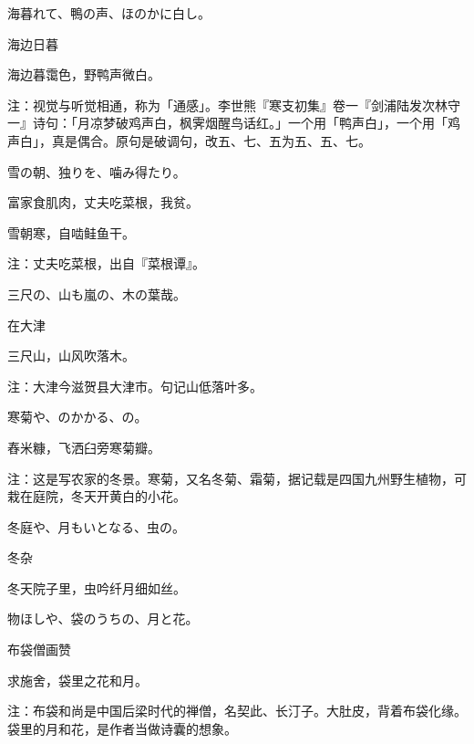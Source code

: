 \begin{haiku}
    {\FH 海暮れて、鴨の声、ほのかに白し。}

    {\FK 海边日暮}

    {\FK 海边暮霭色，野鸭声微白。}

    {\FT 注：视觉与听觉相通，称为「通感」。李世熊『寒支初集』卷一『剑浦陆发次林守一』诗句：「月凉梦破鸡声白，枫霁烟醒鸟话红。」一个用「鸭声白」，一个用「鸡声白」，真是偶合。原句是破调句，改五、七、五为五、五、七。}
\end{haiku}

\begin{haiku}
    {\FH 雪の朝、独りを、噛み得たり。}

    {\FK 富家食肌肉，丈夫吃菜根，我贫。}

    {\FK 雪朝寒，自啮鲑鱼干。}

    {\FT 注：丈夫吃菜根，出自『菜根谭』。}
\end{haiku}

\begin{haiku}
    {\FH 三尺の、山も嵐の、木の葉哉。}

    {\FK 在大津}

    {\FK 三尺山，山风吹落木。}

    {\FT 注：大津今滋贺县大津市。句记山低落叶多。}
\end{haiku}

\begin{haiku}
    {\FH 寒菊や、のかかる、の。}

    {\FK 舂米糠，飞洒臼旁寒菊瓣。}

    {\FT 注：这是写农家的冬景。寒菊，又名冬菊、霜菊，据记载是四国九州野生植物，可栽在庭院，冬天开黄白的小花。}
\end{haiku}

\begin{haiku}
    {\FH 冬庭や、月もいとなる、虫の。}

    {\FK 冬杂}

    {\FK 冬天院子里，虫吟纤月细如丝。}
\end{haiku}

\begin{haiku}
    {\FH 物ほしや、袋のうちの、月と花。}

    {\FK 布袋僧画赞}

    {\FK 求施舍，袋里之花和月。}

    {\FT 注：布袋和尚是中国后梁时代的禅僧，名契此、长汀子。大肚皮，背着布袋化缘。袋里的月和花，是作者当做诗囊的想象。}
\end{haiku}

